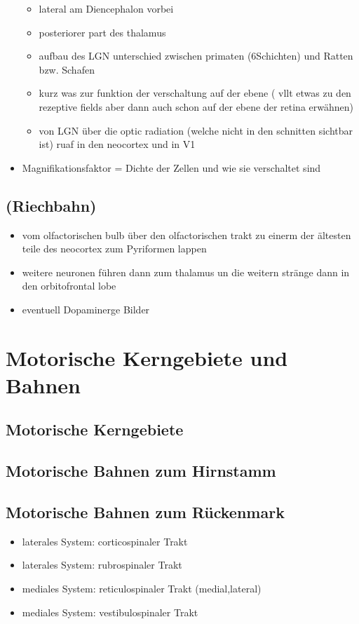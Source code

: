 \documentclass[12pt,a4paper,pdftex]{article}
\begin{document}
\begin{itemize}
    \begin{itemize}
        \item lateral am Diencephalon  vorbei
        \item posteriorer part des thalamus
        \item aufbau des LGN unterschied zwischen primaten (6Schichten) und Ratten bzw. Schafen
        \item kurz was zur funktion der verschaltung auf der ebene ( vllt etwas zu den rezeptive fields aber dann auch schon auf der ebene der retina erwähnen)
        \item von LGN über die optic radiation (welche nicht in den schnitten sichtbar ist) ruaf in den neocortex und in V1 
    \end{itemize}
    \item Magnifikationsfaktor = Dichte der Zellen und wie sie verschaltet sind
    \\
\end{itemize}
\subsection{(Riechbahn)}
\begin{itemize}
    \item vom olfactorischen bulb über den olfactorischen trakt zu einerm der ältesten teile des neocortex zum Pyriformen lappen
    \item weitere neuronen führen dann zum thalamus un die weitern stränge dann in den orbitofrontal lobe \cite{smith2008biology} 
    \item eventuell Dopaminerge Bilder
\end{itemize}

\newpage
\section{Motorische Kerngebiete und Bahnen}
\subsection{Motorische Kerngebiete}
\subsection{Motorische Bahnen zum Hirnstamm}
\subsection{Motorische Bahnen zum Rückenmark}
\begin{itemize}
    \item laterales System: corticospinaler Trakt
    \item laterales System: rubrospinaler Trakt
    \item mediales System: reticulospinaler Trakt (medial,lateral)
    \item mediales System: vestibulospinaler Trakt
\end{itemize}
\end{document}

